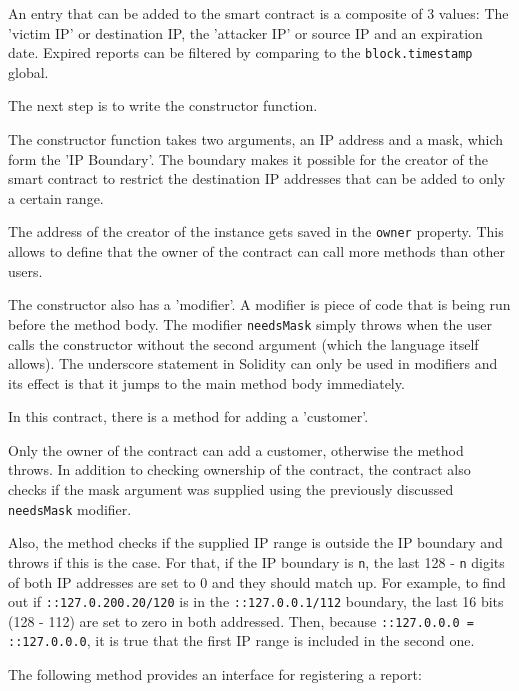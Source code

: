 An entry that can be added to the smart contract is a composite of 3 values: The 'victim IP' or destination IP, the 'attacker IP' or source IP and an expiration date. Expired reports can be filtered by comparing to the \texttt{block.timestamp} global.

The next step is to write the constructor function.



The constructor function takes two arguments, an IP address and a mask, which form the 'IP Boundary'. The boundary makes it possible for the creator of the smart contract to restrict the destination IP addresses that can be added to only a certain range.

The address of the creator of the instance gets saved in the \texttt{owner} property. This allows to define that the owner of the contract can call more methods than other users.

The constructor also has a 'modifier'. A modifier is piece of code that is being run before the method body. The modifier \texttt{needsMask} simply throws when the user calls the constructor without the second argument (which the language itself allows). The underscore statement in Solidity can only be used in modifiers and its effect is that it jumps to the main method body immediately.

In this contract, there is a method for adding a 'customer'.



Only the owner of the contract can add a customer, otherwise the method throws. In addition to checking ownership of the contract, the contract also checks if the mask argument was supplied using the previously discussed \texttt{needsMask} modifier.

Also, the method checks if the supplied IP range is outside the IP boundary and throws if this is the case. For that, if the IP boundary is \texttt{n}, the last 128 - \texttt{n} digits of both IP addresses are set to 0 and they should match up. For example, to find out if \texttt{::127.0.200.20/120} is in the \texttt{::127.0.0.1/112} boundary, the last 16 bits (128 - 112) are set to zero in both addressed. Then, because \texttt{::127.0.0.0 = ::127.0.0.0}, it is true that the first IP range is included in the second one.

The following method provides an interface for registering a report:

